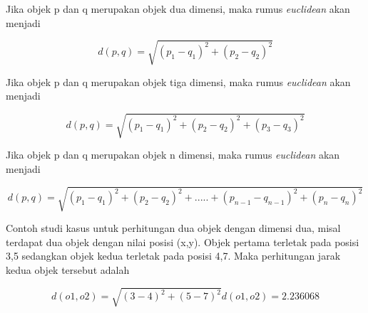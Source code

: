 Jika objek p dan q merupakan objek dua dimensi, maka rumus \textsl{euclidean} akan menjadi

\begin{displaymath}
	d(p,q) = \sqrt{(p_{1} - q_{1})^{2} + (p_{2} - q_{2})^{2}}
\end{displaymath}

Jika objek p dan q merupakan objek tiga dimensi, maka rumus \textsl{euclidean} akan menjadi

\begin{displaymath}
	d(p,q) = \sqrt{(p_{1} - q_{1})^{2} + (p_{2} - q_{2})^{2} + (p_{3} - q_{3})^{2}}
\end{displaymath}

Jika objek p dan q merupakan objek n dimensi, maka rumus \textsl{euclidean} akan menjadi

\begin{displaymath}
	d(p,q) = \sqrt{(p_{1} - q_{1})^{2} + (p_{2} - q_{2})^{2} + ..... + (p_{n-1} - q_{n-1})^{2} + (p_{n} - q_{n})^{2}}
\end{displaymath}

Contoh studi kasus untuk perhitungan dua objek dengan dimensi dua, misal terdapat dua objek dengan nilai posisi (x,y). Objek pertama terletak pada posisi 3,5 sedangkan objek kedua terletak pada posisi 4,7. Maka perhitungan jarak kedua objek tersebut adalah

\begin{displaymath}
	d(o1,o2) = \sqrt{(3 - 4)^{2} + (5 - 7)^{2}}
	d(o1,o2) = 2.236068
\end{displaymath}















